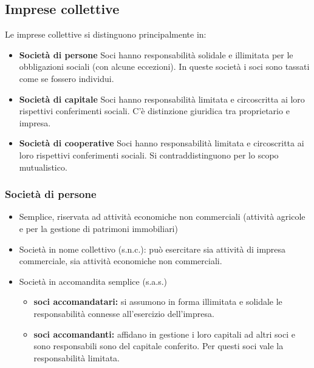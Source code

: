 \documentclass[../main.tex]{subfiles}
\begin{document}
\subsection{Imprese collettive}

Le imprese collettive si distinguono principalmente in:

\begin{itemize}
\item \textbf{Società di persone}
Soci hanno responsabilità solidale e illimitata per le obbligazioni sociali (con alcune eccezioni). In queste società i soci sono tassati come se fossero individui.

\item \textbf{Società di capitale}
Soci hanno responsabilità limitata e circoscritta ai loro rispettivi conferimenti sociali.
C'è distinzione giuridica tra proprietario e impresa.

\item \textbf{Società di cooperative} Soci hanno responsabilità limitata e circoscritta ai loro rispettivi conferimenti sociali.
Si contraddistinguono per lo scopo mutualistico.
\end{itemize}

\subsubsection{Società di persone}

\begin{itemize}
\item
Semplice, riservata ad attività economiche non commerciali (attività agricole e per la gestione di patrimoni immobiliari)
\item Società in nome collettivo (s.n.c.): può esercitare sia attività di impresa commerciale, sia attività economiche non commerciali.
\item Società in accomandita semplice (s.a.s.)

	\begin{itemize}
	\item \textbf{soci accomandatari:} si assumono in forma illimitata e solidale le responsabilità connesse all'esercizio dell'impresa.
	\item \textbf{soci accomandanti:} affidano in gestione i loro capitali ad altri soci e sono responsabili sono del capitale conferito. Per questi soci vale la responsabilità limitata.
	
	\end{itemize}
\end{itemize}
\end{document}
